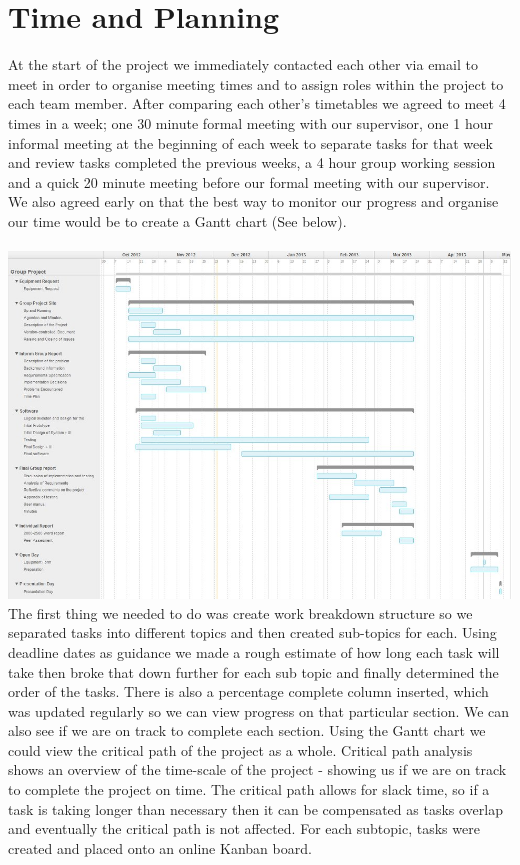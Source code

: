 \documentclass[10pt,a4paper]{article}
\begin{document}
\section{Time and Planning}
At the start of the project we immediately contacted each other via email to meet in order to organise meeting times and to assign roles within the project to each team member. After comparing each other's timetables we agreed to meet 4 times in a week; one 30 minute formal meeting with our supervisor, one 1 hour informal meeting at the beginning of each week to separate tasks for that week and review tasks completed the previous weeks, a 4 hour group working session and a quick 20 minute meeting before our formal meeting with our supervisor. We also agreed early on that the best way to monitor our progress and organise our time would be to create a Gantt chart (See below). \\
\\
\includegraphics[scale=0.7, angle=270]{gantt.png}
\pagebreak
\\
The first thing we needed to do was create work breakdown structure so we separated tasks into different topics and then created sub-topics for each. Using deadline dates as guidance we made a rough estimate of how long each task will take then broke that down further for each sub topic and finally determined the order of the tasks. There is also a percentage complete column inserted, which was updated regularly so we can view progress on that particular section. We can also see if we are on track to complete each section. Using the Gantt chart we could view the critical path of the project as a whole. Critical path analysis shows an overview of the time-scale of the project - showing us if we are on track to complete the project on time. The critical path allows for slack time, so if a task is taking longer than necessary then it can be compensated as tasks overlap and eventually the critical path is not affected. For each subtopic, tasks were created and placed onto an online Kanban board.\\
\end{document}
